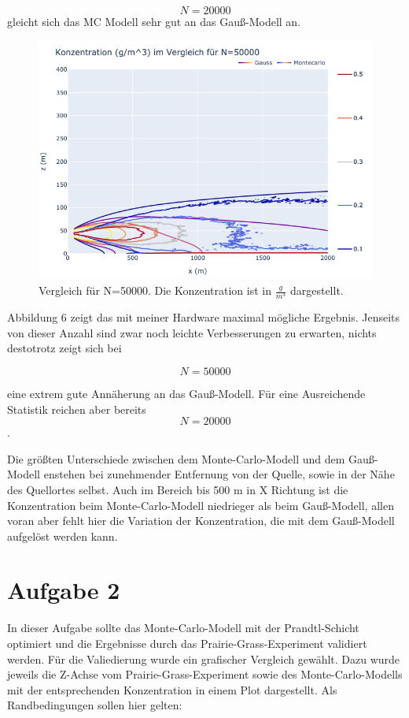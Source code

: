 \documentclass[ngerman]{scrartcl}
\begin{document}
\begin{equation}
	N=20000
\end{equation}
gleicht sich das MC Modell sehr gut an das Gauß-Modell an.
\begin{figure}[H]
	\centering
	\includegraphics[scale=0.5]{Bilder/1b50k.png}
	\caption{Vergleich für N=50000.  Die Konzentration ist in $\frac{\si{g}}{\si{m^3}}$ dargestellt.}
	\label{fig:my_label}
\end{figure}
Abbildung 6  zeigt das mit meiner Hardware maximal mögliche Ergebnis. Jenseits von dieser Anzahl sind zwar noch leichte Verbesserungen zu erwarten, nichts destotrotz zeigt sich bei 

\begin{equation}
	N=50000
\end{equation}

eine extrem gute Annäherung an das Gauß-Modell. Für eine Ausreichende Statistik reichen aber bereits 
\begin{equation}
	N=20000
\end{equation}.

Die größten Unterschiede zwischen dem Monte-Carlo-Modell und dem Gauß-Modell enstehen bei zunehmender Entfernung von der Quelle, sowie in der Nähe des Quellortes selbst. Auch im Bereich bis 500 m  in X Richtung ist die Konzentration beim Monte-Carlo-Modell niedrieger als beim Gauß-Modell, allen voran aber fehlt hier die Variation der Konzentration, die mit dem Gauß-Modell aufgelöst werden kann. 
\section{Aufgabe 2}
In dieser Aufgabe sollte das Monte-Carlo-Modell mit der Prandtl-Schicht optimiert und die Ergebnisse durch das Prairie-Grass-Experiment validiert werden. Für die Valiedierung wurde ein grafischer Vergleich gewählt. Dazu wurde jeweils die Z-Achse vom Prairie-Grass-Experiment sowie des Monte-Carlo-Modells mit der entsprechenden Konzentration in einem Plot dargestellt. Als Randbedingungen sollen hier gelten:
\end{document}
